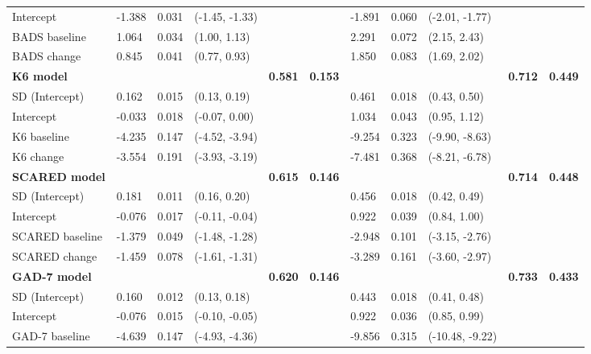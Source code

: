 \documentclass[
  journal=largetwo,
  manuscript=original-article,
  year=2023-Submission,
]{cup-journal}
\begin{document}
\begin{table}
\begin{tabular}[t]{lll>{\raggedright\arraybackslash}p{6em}llll>{\raggedright\arraybackslash}p{6em}ll}
\cmidrule{1-11}
Intercept & -1.388 & 0.031 & (-1.45, -1.33) &  &  & -1.891 & 0.060 & (-2.01, -1.77) &  & \\
\cmidrule{1-11}
BADS baseline & 1.064 & 0.034 & (1.00, 1.13) &  &  & 2.291 & 0.072 & (2.15, 2.43) &  & \\
\cmidrule{1-11}
BADS change & 0.845 & 0.041 & (0.77, 0.93) &  &  & 1.850 & 0.083 & (1.69, 2.02) &  & \\
\cmidrule{1-11}
\textbf{K6 model} & \textbf{} & \textbf{} & \textbf{} & \textbf{0.581} & \textbf{0.153} & \textbf{} & \textbf{} & \textbf{} & \textbf{0.712} & \textbf{0.449}\\
\cmidrule{1-11}
SD (Intercept) & 0.162 & 0.015 & (0.13, 0.19) &  &  & 0.461 & 0.018 & (0.43, 0.50) &  & \\
\cmidrule{1-11}
Intercept & -0.033 & 0.018 & (-0.07,  0.00) &  &  & 1.034 & 0.043 & (0.95, 1.12) &  & \\
\cmidrule{1-11}
K6 baseline & -4.235 & 0.147 & (-4.52, -3.94) &  &  & -9.254 & 0.323 & (-9.90, -8.63) &  & \\
\cmidrule{1-11}
K6 change & -3.554 & 0.191 & (-3.93, -3.19) &  &  & -7.481 & 0.368 & (-8.21, -6.78) &  & \\
\cmidrule{1-11}
\textbf{SCARED model} & \textbf{} & \textbf{} & \textbf{} & \textbf{0.615} & \textbf{0.146} & \textbf{} & \textbf{} & \textbf{} & \textbf{0.714} & \textbf{0.448}\\
\cmidrule{1-11}
SD (Intercept) & 0.181 & 0.011 & (0.16, 0.20) &  &  & 0.456 & 0.018 & (0.42, 0.49) &  & \\
\cmidrule{1-11}
Intercept & -0.076 & 0.017 & (-0.11, -0.04) &  &  & 0.922 & 0.039 & (0.84, 1.00) &  & \\
\cmidrule{1-11}
SCARED baseline & -1.379 & 0.049 & (-1.48, -1.28) &  &  & -2.948 & 0.101 & (-3.15, -2.76) &  & \\
\cmidrule{1-11}
SCARED change & -1.459 & 0.078 & (-1.61, -1.31) &  &  & -3.289 & 0.161 & (-3.60, -2.97) &  & \\
\cmidrule{1-11}
\textbf{GAD-7 model} & \textbf{} & \textbf{} & \textbf{} & \textbf{0.620} & \textbf{0.146} & \textbf{} & \textbf{} & \textbf{} & \textbf{0.733} & \textbf{0.433}\\
\cmidrule{1-11}
SD (Intercept) & 0.160 & 0.012 & (0.13, 0.18) &  &  & 0.443 & 0.018 & (0.41, 0.48) &  & \\
\cmidrule{1-11}
Intercept & -0.076 & 0.015 & (-0.10, -0.05) &  &  & 0.922 & 0.036 & (0.85, 0.99) &  & \\
\cmidrule{1-11}
GAD-7 baseline & -4.639 & 0.147 & (-4.93, -4.36) &  &  & -9.856 & 0.315 & (-10.48,  -9.22) &  & \\

\end{tabular}
\end{table}
\end{document}
